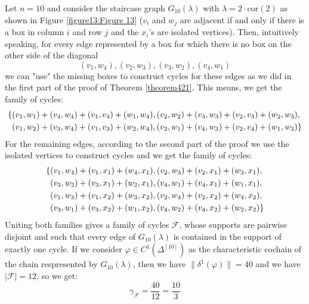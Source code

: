 \begin{expl}

Let \(n=10\) and consider the staircase graph \(G_{10}(\lambda)\) with \(\lambda=2\cdot\text{cor}(2)\) as shown in Figure \ref{figure13:Figure 13} (\(v_i\) and \(w_j\) are adjacent if and only if there is a box in column \(i\) and row \(j\) and the \(x_i\)'s are isolated vertices). Then, intuitively speaking, for every edge represented by a box for which there is no box on the other side of the diagonal
\[
(v_1,w_4),(v_2,w_3),(v_3,w_2),(v_4,w_1)
\]
we can "use" the missing boxes to construct cycles for these edges as we did in the first part of the proof of Theorem \ref{theorem421}. This means, we get the family of cycles:
\begin{align}
\{&(v_1,w_1)+(v_4,w_4)+(v_1,v_4)+(w_1,w_4),(v_2,w_2)+(v_3,w_3)+(v_2,v_3)+(w_2,w_3),\notag\\
&(v_1,w_2)+(v_3,w_4)+(v_1,v_3)+(w_2,w_4),(v_2,w_1)+(v_4,w_3)+(v_2,v_4)+(w_1,w_3)\}\notag
\end{align}
For the remaining edges, according to the second part of the proof we use the isolated vertices to construct cycles and we get the family of cycles:
\begin{align}
\{&(v_1,w_4)+(v_1,x_1)+(w_4,x_1),(v_2,w_3)+(v_2,x_1)+(w_3,x_1),\notag\\
&(v_3,w_2)+(v_3,x_1)+(w_2,x_1),(v_4,w_1)+(v_4,x_1)+(w_1,x_1),\notag\\
&(v_1,w_3)+(v_1,x_2)+(w_3,x_2),(v_2,w_4)+(v_2,x_2)+(w_4,x_2),\notag\\
&(v_3,w_1)+(v_3,x_2)+(w_1,x_2),(v_4,w_2)+(v_4,x_2)+(w_2,x_2)\}\notag
\end{align}
Uniting both families gives a family of cycles \(\mathcal{F}\), whose supports are pairwise disjoint and such that every edge of \(G_{10}(\lambda)\) is contained in the support of exactly one cycle. If we consider \(\varphi\in C^1(\Delta^{[10]})\) as the characteristic cochain of the chain respresented by \(G_{10}(\lambda)\), then we have \(\|\delta^1(\varphi)\|=40\) and we have \(|\mathcal{F}|=12\), so we get:
\[
\gamma_{\mathcal{F}}=\frac{40}{12}=\frac{10}{3}
\]

\begin{figure}[ht]
\centering
{}
\end{figure}
\end{expl}
